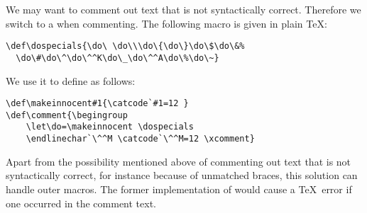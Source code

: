 We may want to comment out text that is not syntactically
correct. Therefore we switch to a
when commenting. The following macro is given 
in plain \TeX:
\begin{verbatim}
\def\dospecials{\do\ \do\\\do\{\do\}\do\$\do\&%
  \do\#\do\^\do\^^K\do\_\do\^^A\do\%\do\~}
\end{verbatim}
We use it to define  as follows:
\begin{verbatim}
\def\makeinnocent#1{\catcode`#1=12 }
\def\comment{\begingroup
    \let\do=\makeinnocent \dospecials
    \endlinechar`\^^M \catcode`\^^M=12 \xcomment}
\end{verbatim}
Apart from the possibility mentioned above of commenting
out text that is not syntactically correct, for instance
because of unmatched braces, this solution can handle
outer macros. The former implementation of 
would cause a \TeX\ error if one occurred in the comment text.

